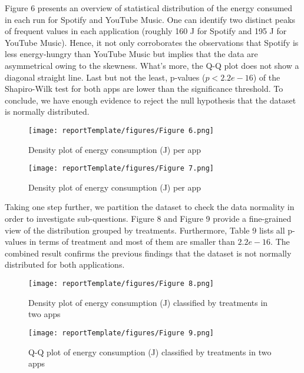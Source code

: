 Figure 6 presents an overview of statistical distribution of the energy consumed in each run for Spotify and YouTube Music. One can identify two distinct peaks of frequent values in each application (roughly 160 J for Spotify and 195 J for YouTube Music). Hence, it not only corroborates the observations that Spotify is less energy-hungry than YouTube Music but implies that the data are asymmetrical owing to the skewness. What’s more, the Q-Q plot does not show a diagonal straight line. Last but not the least, p-values ($p<2.2e - 16$) of the Shapiro-Wilk test for both apps are lower than the significance threshold. To conclude, we have enough evidence to reject the null hypothesis that the dataset is normally distributed. 

\begin{figure}[htbp]
 \centering
 \texttt{[image: reportTemplate/figures/Figure 6.png]}\caption{Density plot of energy consumption (J) per app}
\end{figure}

\begin{figure}[htbp]
 \centering
 \texttt{[image: reportTemplate/figures/Figure 7.png]}\caption{Density plot of energy consumption (J) per app}
\end{figure}

Taking one step further, we partition the dataset to check the data normality in order to investigate sub-questions. Figure 8 and Figure 9 provide a fine-grained view of the distribution grouped by treatments. Furthermore, Table 9 lists all p-values in terms of treatment and most of them are smaller than $2.2e - 16$. The combined result confirms the previous findings that the dataset is not normally distributed for both applications.  

\begin{figure}[htbp]
 \centering
 \texttt{[image: reportTemplate/figures/Figure 8.png]}\caption{Density plot of energy consumption (J) classified by treatments in two apps}
\end{figure}

\begin{figure}[htbp]
 \centering
 \texttt{[image: reportTemplate/figures/Figure 9.png]}\caption{Q-Q plot of energy consumption (J) classified by treatments in two apps}
\end{figure}

